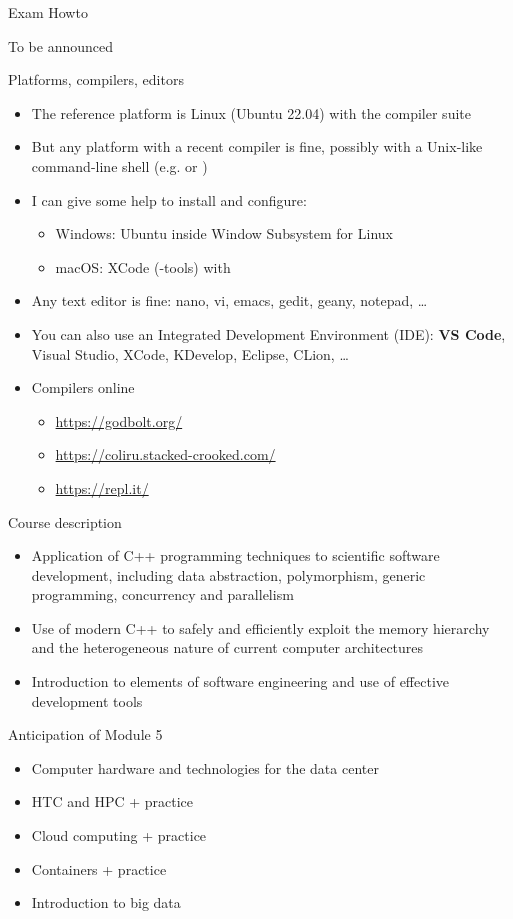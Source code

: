 \begin{frame}{Exam Howto}

  To be announced

\end{frame}

\begin{frame}{Platforms, compilers, editors}
  \begin{itemize}[<+->]
  \item The reference platform is Linux (Ubuntu 22.04) with the 
    compiler suite
  \item But any platform with a recent compiler is fine, possibly with a
    Unix-like command-line shell (e.g.  or )
  \item I can give some help to install and configure:
    \begin{itemize}[<.->]
    \item Windows: Ubuntu inside Window Subsystem for Linux
    \item macOS: XCode (-tools) with 
    \end{itemize}
  \item Any text editor is fine: nano, vi, emacs, gedit, geany, notepad, \ldots
  \item You can also use an Integrated Development Environment (IDE): \textbf{VS Code}, Visual Studio, XCode, KDevelop,
  Eclipse, CLion, \ldots
  \item Compilers online
    \begin{itemize}[<.->]
    \item \url{https://godbolt.org/}
    \item \url{https://coliru.stacked-crooked.com/}
    \item \url{https://repl.it/}
    \end{itemize}
  \end{itemize}
\end{frame}

\begin{frame}{Course description}

  \begin{itemize}
  \item Application of C++ programming techniques to scientific software development, including data abstraction,
  polymorphism, generic programming, concurrency and parallelism
  \item Use of modern C++ to safely and efficiently exploit the memory hierarchy and the heterogeneous nature of current
  computer architectures
  \item Introduction to elements of software engineering and use of effective development tools
  \end{itemize}

\end{frame}

\begin{frame}{Anticipation of Module 5}

  \begin{itemize}
  \item Computer hardware and technologies for the data center
  \item HTC and HPC + practice
  \item Cloud computing + practice
  \item Containers + practice
  \item Introduction to big data
  \end{itemize}

\end{frame}
